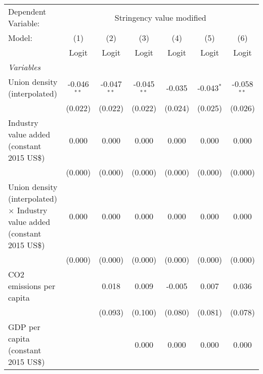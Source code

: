 
\begingroup
\centering
\begin{tabular}{lcccccc}
   \toprule
   Dependent Variable: & \multicolumn{6}{c}{Stringency value modified}\\
   Model:                                                                            & (1)           & (2)           & (3)           & (4)     & (5)          & (6)\\  
                                                                                     &  Logit        & Logit         & Logit         & Logit   & Logit        & Logit\\  
   \midrule
   \emph{Variables}\\
   Union density (interpolated)                                                      & -0.046$^{**}$ & -0.047$^{**}$ & -0.045$^{**}$ & -0.035  & -0.043$^{*}$ & -0.058$^{**}$\\   
                                                                                     & (0.022)       & (0.022)       & (0.022)       & (0.024) & (0.025)      & (0.026)\\   
   Industry value added (constant 2015 US\$)                                         & 0.000         & 0.000         & 0.000         & 0.000   & 0.000        & 0.000\\   
                                                                                     & (0.000)       & (0.000)       & (0.000)       & (0.000) & (0.000)      & (0.000)\\   
   Union density (interpolated) $\times$ Industry value added (constant 2015 US\$)   & 0.000         & 0.000         & 0.000         & 0.000   & 0.000        & 0.000\\   
                                                                                     & (0.000)       & (0.000)       & (0.000)       & (0.000) & (0.000)      & (0.000)\\   
   CO2 emissions per capita                                                          &               & 0.018         & 0.009         & -0.005  & 0.007        & 0.036\\   
                                                                                     &               & (0.093)       & (0.100)       & (0.080) & (0.081)      & (0.078)\\   
   GDP per capita (constant 2015 US\$)                                               &               &               & 0.000         & 0.000   & 0.000        & 0.000\\   

\end{tabular}
